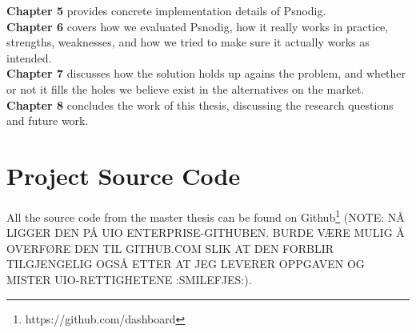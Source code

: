 \textbf{Chapter 5} provides concrete implementation details of Psnodig. \hfill \\

\textbf{Chapter 6} covers how we evaluated Psnodig, how it really works in practice, strengths, weaknesses, and how we tried to make sure it actually works as intended. \hfill \\

\textbf{Chapter 7} discusses how the solution holds up agains the problem, and whether or not it fills the holes we believe exist in the alternatives on the market. \hfill \\

\textbf{Chapter 8} concludes the work of this thesis, discussing the research questions and future work.

\section{Project Source Code}

All the source code from the master thesis can be found on Github\footnote{https://github.com/dashboard} (NOTE: NÅ LIGGER DEN PÅ UIO ENTERPRISE-GITHUBEN. BURDE VÆRE MULIG Å OVERFØRE DEN TIL GITHUB.COM SLIK AT DEN FORBLIR TILGJENGELIG OGSÅ ETTER AT JEG LEVERER OPPGAVEN OG MISTER UIO-RETTIGHETENE :SMILEFJES:).